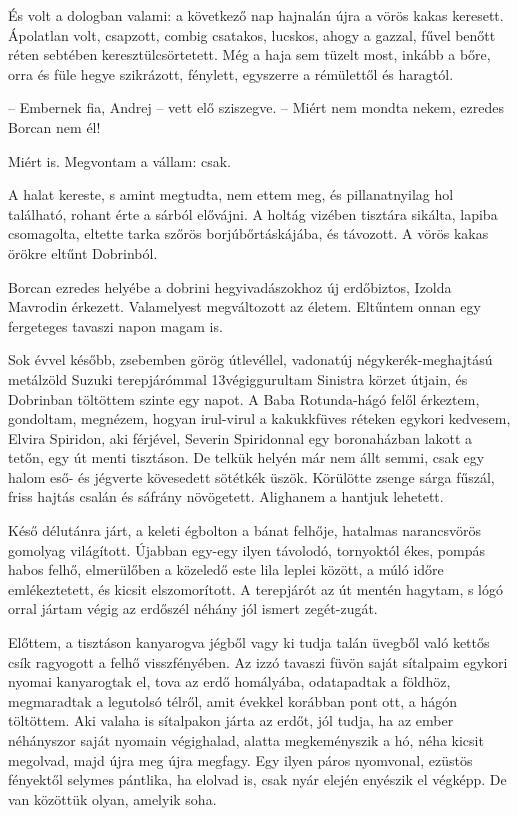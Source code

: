\documentclass{IEEEtran}
\begin{document}
És volt a dologban valami: a következő nap hajnalán újra a vörös kakas
keresett. Ápolatlan volt, csapzott, combig csatakos, lucskos, ahogy a gazzal,
fűvel benőtt réten sebtében keresztülcsörtetett. Még a haja sem tüzelt most,
inkább a bőre, orra és füle hegye szikrázott, fénylett, egyszerre a rémülettől
és haragtól.

– Embernek fia, Andrej – vett elő sziszegve. – Miért nem mondta nekem, ezredes
Borcan nem él!

Miért is. Megvontam a vállam: csak.

A halat kereste, s amint megtudta, nem ettem meg, és pillanatnyilag hol
található, rohant érte a sárból elővájni. A holtág vizében tisztára sikálta,
lapiba csomagolta, eltette tarka szőrös borjúbőrtáskájába, és távozott. A
vörös kakas örökre eltűnt Dobrinból.

Borcan ezredes helyébe a dobrini hegyivadászokhoz új erdőbiztos, Izolda
Mavrodin érkezett. Valamelyest megváltozott az életem. Eltűntem onnan egy
fergeteges tavaszi napon magam is.

Sok évvel később, zsebemben görög útlevéllel, vadonatúj négykerék-meghajtású
metálzöld Suzuki terepjárómmal 13végiggurultam Sinistra körzet útjain, és
Dobrinban töltöttem szinte egy napot. A Baba Rotunda-hágó felől érkeztem,
gondoltam, megnézem, hogyan irul-virul a kakukkfüves réteken egykori kedvesem,
Elvira Spiridon, aki férjével, Severin Spiridonnal egy boronaházban lakott a
tetőn, egy út menti tisztáson. De telkük helyén már nem állt semmi, csak egy
halom eső- és jégverte kövesedett sötétkék üszök. Körülötte zsenge sárga
fűszál, friss hajtás csalán és sáfrány növögetett. Alighanem a hantjuk
lehetett.

Késő délutánra járt, a keleti égbolton a bánat felhője, hatalmas narancsvörös
gomolyag világított. Újabban egy-egy ilyen távolodó, tornyoktól ékes, pompás
habos felhő, elmerülőben a közeledő este lila leplei között, a múló időre
emlékeztetett, és kicsit elszomorított. A terepjárót az út mentén hagytam, s
lógó orral jártam végig az erdőszél néhány jól ismert zegét-zugát.

Előttem, a tisztáson kanyarogva jégből vagy ki tudja talán üvegből való kettős
csík ragyogott a felhő visszfényében. Az izzó tavaszi füvön saját sítalpaim
egykori nyomai kanyarogtak el, tova az erdő homályába, odatapadtak a földhöz,
megmaradtak a legutolsó télről, amit évekkel korábban pont ott, a hágón
töltöttem. Aki valaha is sítalpakon járta az erdőt, jól tudja, ha az ember
néhányszor saját nyomain végighalad, alatta megkeményszik a hó, néha kicsit
megolvad, majd újra meg újra megfagy. Egy ilyen páros nyomvonal, ezüstös
fényektől selymes pántlika, ha elolvad is, csak nyár elején enyészik el
végképp. De van közöttük olyan, amelyik soha.
\end{document}
